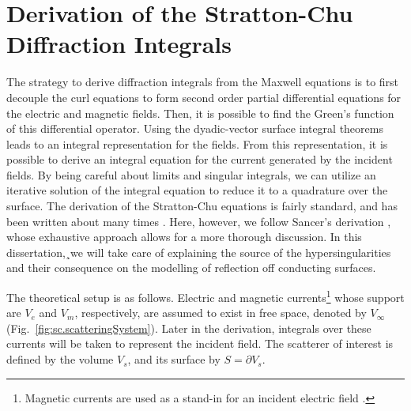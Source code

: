 \documentclass[11pt,SymmetricalJury]{inrsthesis/inrsthesis}
\begin{document}
\section{Derivation of the Stratton-Chu Diffraction Integrals}

The strategy to derive diffraction integrals from the Maxwell equations is to
first decouple the curl equations to form second order partial differential equations
for the electric and magnetic fields. Then, it is possible to find the Green's
function of this differential operator. Using the dyadic-vector surface integral
theorems leads to an integral representation for the fields. From this representation,
it is possible to derive an integral equation for the current generated by the
incident fields. By being careful about limits and singular integrals, we can
utilize an iterative solution of the integral equation to reduce it to a quadrature
over the surface.
The derivation of the Stratton-Chu equations is fairly standard, and has been
written about many times \cite{}. Here, however, we follow Sancer's derivation \cite{Sancer1968},
whose exhaustive approach allows for a more thorough discussion. In this
dissertation,¸we will take care of explaining the source of the
hypersingularities and their consequence on the modelling of reflection off
conducting surfaces.

The theoretical setup is as follows. Electric and magnetic currents\footnote{Magnetic
currents are used as a stand-in for an incident electric field \cite{Schelkunoff1936}.}
whose support are $V_e$ and $V_m$, respectively, are assumed to exist in free
space, denoted by $V_\infty$ (Fig.~\ref{fig:sc.scatteringSystem}).
Later in the derivation, integrals over these currents will be taken to represent the incident
field.
The scatterer
of interest is defined by the volume $V_s$, and its surface by $S=\partial V_s$.
\end{document}
